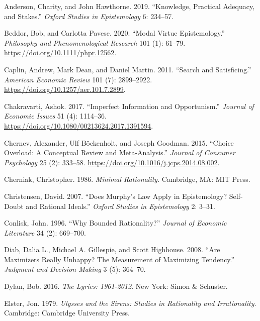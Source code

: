 \documentclass[
  11pt,
  letterpaper,
  DIV=11,
  numbers=noendperiod,
  oneside]{scrartcl}
\newlength{\cslhangindent}
\newenvironment{CSLReferences}[2] %
 {\begin{list}{}{%
  \setlength{\itemindent}{0pt}
  \setlength{\leftmargin}{0pt}
  \setlength{\parsep}{0pt}
  \ifodd #1
   \setlength{\leftmargin}{\cslhangindent}
   \setlength{\itemindent}{-1\cslhangindent}
  \fi
  \setlength{\itemsep}{#2\baselineskip}}}
 {\end{list}}
\begin{document}
\label{refs}
\begin{CSLReferences}{1}{0}
Anderson, Charity, and John Hawthorne. 2019. {``Knowledge, Practical
Adequacy, and Stakes.''} \emph{Oxford Studies in Epistemology} 6:
234--57.

Beddor, Bob, and Carlotta Pavese. 2020. {``Modal Virtue Epistemology.''}
\emph{Philosophy and Phenomenological Research} 101 (1): 61--79.
\url{https://doi.org/10.1111/phpr.12562}.

Caplin, Andrew, Mark Dean, and Daniel Martin. 2011. {``Search and
Satisficing.''} \emph{American Economic Review} 101 (7): 2899--2922.
\url{https://doi.org/10.1257/aer.101.7.2899}.

Chakravarti, Ashok. 2017. {``Imperfect Information and Opportunism.''}
\emph{Journal of Economic Issues} 51 (4): 1114--36.
\url{https://doi.org/10.1080/00213624.2017.1391594}.

Chernev, Alexander, Ulf Böckenholt, and Joseph Goodman. 2015. {``Choice
Overload: A Conceptual Review and Meta-Analysis.''} \emph{Journal of
Consumer Psychology} 25 (2): 333--58.
\url{https://doi.org/10.1016/j.jcps.2014.08.002}.

Cherniak, Christopher. 1986. \emph{Minimal Rationality}. Cambridge, MA:
MIT Press.

Christensen, David. 2007. {``Does Murphy's Law Apply in Epistemology?
Self-Doubt and Rational Ideals.''} \emph{Oxford Studies in Epistemology}
2: 3--31.

Conlisk, John. 1996. {``Why Bounded Rationality?''} \emph{Journal of
Economic Literature} 34 (2): 669--700.

Diab, Dalia L., Michael A. Gillespie, and Scott Highhouse. 2008. {``Are
Maximizers Really Unhappy? The Measurement of Maximizing Tendency.''}
\emph{Judgment and Decision Making} 3 (5): 364--70.

Dylan, Bob. 2016. \emph{The Lyrics: 1961-2012}. New York: Simon \&
Schuster.

Elster, Jon. 1979. \emph{Ulysses and the Sirens: Studies in Rationality
and Irrationality}. Cambridge: Cambridge University Press.


\end{CSLReferences}
\end{document}
